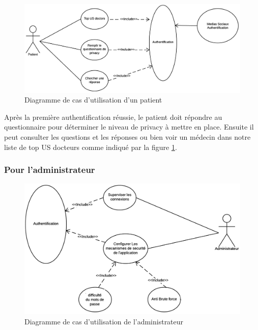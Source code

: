 \begin{figure}[!ht]
\begin{center}
\includegraphics[scale=0.4]{patient.jpg}
\caption{Diagramme de cas d'utilisation d'un patient}
\label{patient}
\end{center}
\end{figure}

Après la première authentification réussie, le patient doit répondre au questionnaire pour déterminer le niveau de privacy à mettre en place. Ensuite il peut consulter les questions et les réponses ou bien voir un médecin dans notre liste de top US docteurs comme indiqué par la figure \ref{patient}.

\subsubsection{Pour l'administrateur}

\begin{figure}[!ht]
\begin{center}
\includegraphics[scale=0.42]{admin.jpg}
\caption{Diagramme de cas d'utilisation de l'administrateur}
\label{admin}
\end{center}
\end{figure}

